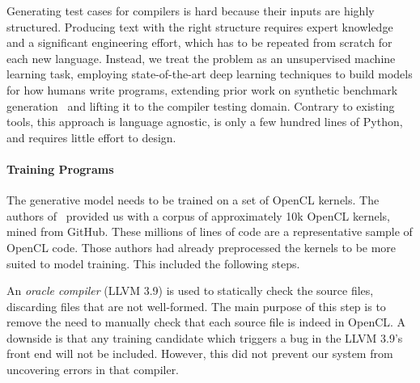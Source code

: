 Generating test cases for compilers is hard because their inputs are highly structured. Producing text with the right structure requires expert knowledge and a significant engineering effort, which has to be repeated from scratch for each new language. Instead, we treat the problem as an unsupervised machine learning task, employing state-of-the-art deep learning techniques to build models for how humans write programs, extending prior work on synthetic benchmark generation~\cite{Cummins2017a} and lifting it to the compiler testing domain. Contrary to existing tools, this approach is language agnostic, is only a few hundred lines of Python, and requires little effort to design.


\paragraph{Training Programs} The generative model needs to be trained on a set of OpenCL kernels. The authors of~\cite{Cummins2017a} provided us with a corpus of approximately 10k OpenCL kernels, mined from GitHub. These millions of lines of code are a representative sample of OpenCL code. Those authors had already preprocessed the kernels to be more suited to model training. This included the following steps.

An \emph{oracle compiler} (LLVM 3.9) is used to statically check the source files, discarding files that are not well-formed. The main purpose of this step is to remove the need to manually check that each source file is indeed in OpenCL. A downside is that any training candidate which triggers a bug in the LLVM 3.9's front end will not be included. However, this did not prevent our system from uncovering errors in that compiler.

